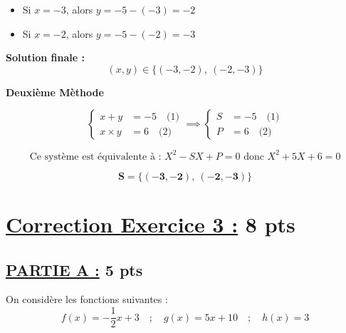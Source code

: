 \documentclass[12pt,a4paper]{article}
\begin{document}
\begin{enumerate}
\begin{itemize}
    \item Si \( x = -3 \), alors \( y = -5 - (-3) = -2 \)
    \item Si \( x = -2 \), alors \( y = -5 - (-2) = -3 \)
\end{itemize}

\textbf{Solution finale :}
\[
\boxed{
(x, y) \in \{ (-3, -2),\ (-2, -3) \}
}
\]
\begin{center}
\textbf{Deuxième Mèthode}
\end{center}  

    \[
    \left\{
    \begin{aligned}
        x + y &= -5 \quad \text{(1)}\\
        x \times y &= 6 \quad \text{(2)}
    \end{aligned}
    \right.\implies
       \left\{
    \begin{aligned}
        S &= -5 \quad \text{(1)}\\
        P &= 6 \quad \text{(2)}
    \end{aligned}
    \right.
    \]    

\[
\text{Ce système est équivalente à : } X^2-SX+P = 0 \text{ donc } X^2+5X+6 = 0
\]    
    
    \begin{resultbox}
    \[
    \mathbf{S =\{(-3, -2),\ (-2, -3)\}}
    \]
		\end{resultbox}
\end{enumerate}

\section*{\underline{ Correction Exercice 3 :} 8 pts}

\subsection*{\underline{PARTIE A :} 5 pts}

On considère les fonctions suivantes :
\[
f(x) = -\frac{1}{2}x + 3 \quad ; \quad g(x) = 5x + 10 \quad ; \quad h(x) = 3
\]
\end{document}
